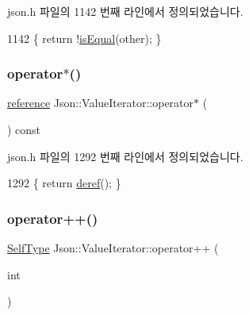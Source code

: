 json.\+h 파일의 1142 번째 라인에서 정의되었습니다.


\begin{DoxyCode}
1142 \{ \textcolor{keywordflow}{return} !\hyperlink{class_json_1_1_value_iterator_base_a010b5ad3f3337ae3732e5d7e16ca5e25}{isEqual}(other); \}
\end{DoxyCode}
\mbox{\label{class_json_1_1_value_iterator_a3be48b0c1729ec2532f1ff27ad465d32}} 
\subsubsection{\texorpdfstring{operator$\ast$()}{operator*()}}
{\footnotesize\ttfamily \hyperlink{class_json_1_1_value_iterator_ae87929b4567aa00372cf602c43b57160}{reference} Json\+::\+Value\+Iterator\+::operator$\ast$ (\begin{DoxyParamCaption}{ }\end{DoxyParamCaption}) const\hspace{0.3cm}{\ttfamily [inline]}}



json.\+h 파일의 1292 번째 라인에서 정의되었습니다.


\begin{DoxyCode}
1292 \{ \textcolor{keywordflow}{return} \hyperlink{class_json_1_1_value_iterator_base_aa5b75c9514a30ba2ea3c9a35c165c18e}{deref}(); \}
\end{DoxyCode}
\mbox{\label{class_json_1_1_value_iterator_abcf4ddd994a010742cd4a436d65acd08}} 
\subsubsection{\texorpdfstring{operator++()}{operator++()}\hspace{0.1cm}{\footnotesize\ttfamily [1/2]}}
{\footnotesize\ttfamily \hyperlink{class_json_1_1_value_iterator_base_a9d2a940d03ea06d20d972f41a89149ee}{Self\+Type} Json\+::\+Value\+Iterator\+::operator++ (\begin{DoxyParamCaption}\item[{int}]{ }\end{DoxyParamCaption})\hspace{0.3cm}{\ttfamily [inline]}}



